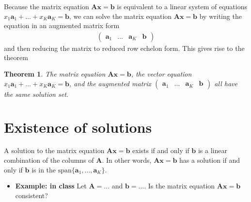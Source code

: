 \documentclass[
]{book}
\providecommand{\tightlist}{%
  \setlength{\itemsep}{0pt}\setlength{\parskip}{0pt}}
\newtheorem{theorem}{Theorem}[chapter]
\theoremstyle{definition}
\theoremstyle{definition}
\theoremstyle{definition}
\theoremstyle{remark}
\begin{document}
Because the matrix equation \(\mathbf{A} \mathbf{x} = \mathbf{b}\) is equivalent to a linear system of equations \(x_1 \mathbf{a}_1 + \ldots + x_K \mathbf{a}_K = \mathbf{b}\), we can solve the matrix equation \(\mathbf{A} \mathbf{x} = \mathbf{b}\) by writing the equation in an augmented matrix form
\[
\begin{aligned}
\begin{pmatrix} \mathbf{a}_1 & \ldots & \mathbf{a}_K & \mathbf{b} \end{pmatrix}
\end{aligned}
\]
and then reducing the matrix to reduced row echelon form. This gives rise to the theorem

\begin{theorem}
\protect\hypertarget{thm:unnamed-chunk-94}{}{\label{thm:unnamed-chunk-94} }The matrix equation \(\mathbf{A} \mathbf{x} = \mathbf{b}\), the vector equation \(x_1 \mathbf{a}_1 + \ldots + x_K \mathbf{a}_K = \mathbf{b}\), and the augmented matrix \(\begin{pmatrix} \mathbf{a}_1 & \ldots & \mathbf{a}_K & \mathbf{b} \end{pmatrix}\) all have the same solution set.
\end{theorem}

\hypertarget{existence-of-solutions}{%
\section{Existence of solutions}\label{existence-of-solutions}}

A solution to the matrix equation \(\mathbf{A} \mathbf{x} = \mathbf{b}\) exists if and only if \(\mathbf{b}\) is a linear combination of the columns of \(\mathbf{A}\). In other words, \(\mathbf{A} \mathbf{x} = \mathbf{b}\) has a solution if and only if \(\mathbf{b}\) is in the \(\mbox{span}\{\mathbf{a}_1, \ldots, \mathbf{a}_K\}\).

\begin{itemize}
\tightlist
\item
  \textbf{Example: in class} Let \(\mathbf{A} =\ldots\) and \(\mathbf{b} = \ldots\). Is the matrix equation \(\mathbf{A} \mathbf{x} = \mathbf{b}\) consistent?
\end{itemize}
\end{document}
